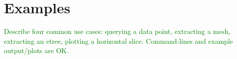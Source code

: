 
\section{Examples}

\textcolor{green}{Describe four common use cases: querying a data point, extracting a mesh, extracting an etree, plotting a horizontal slice. Command-lines and example output/plots are OK.}
